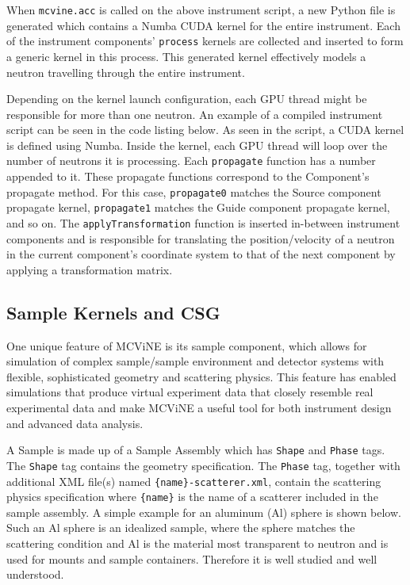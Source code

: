 \vspace{1mm}

\vspace{1mm}

When \texttt{mcvine.acc} is called on the above instrument script, a new Python file is generated which contains a Numba CUDA kernel for the entire instrument. Each of the instrument components' \texttt{process} kernels are collected and inserted to form a generic kernel in this process. This generated kernel effectively models a neutron travelling through the entire instrument.

Depending on the kernel launch configuration, each GPU thread might be responsible for more than one neutron. An example of a compiled instrument script can be seen in the code listing below. As seen in the script, a CUDA kernel is defined using Numba. Inside the kernel, each GPU thread will loop over the number of neutrons it is processing. Each \texttt{propagate} function has a number appended to it. These propagate functions correspond to the Component's propagate method. For this case, \texttt{propagate0} matches the Source component propagate kernel, \texttt{propagate1} matches the Guide component propagate kernel, and so on. The \texttt{applyTransformation} function is inserted in-between instrument components and is responsible for translating the position/velocity of a neutron in the current component's coordinate system to that of the next component by applying a transformation matrix.

\vspace{1mm}

\vspace{1mm}

\subsection{Sample Kernels and CSG}

One unique feature of MCViNE is its sample component, which allows for simulation of complex sample/sample environment and detector systems with flexible, sophisticated geometry and scattering physics. 
This feature has enabled simulations that produce virtual experiment data that closely resemble real experimental data and make MCViNE a useful tool for both instrument design and advanced data analysis. 

A Sample is made up of a Sample Assembly which has \texttt{Shape} and \texttt{Phase} tags.
The \texttt{Shape} tag contains the geometry specification. The \texttt{Phase} tag, together with additional XML file(s) named \texttt{\{name\}-scatterer.xml}, contain the scattering physics specification where \texttt{\{name\}} is the name of a scatterer included in the sample assembly.
A simple example for an aluminum (Al) sphere is shown below.
Such an Al sphere is an idealized sample, where the sphere matches the scattering condition and Al is the material most transparent to neutron and is used for mounts and sample containers. Therefore it is well studied and well understood. 

